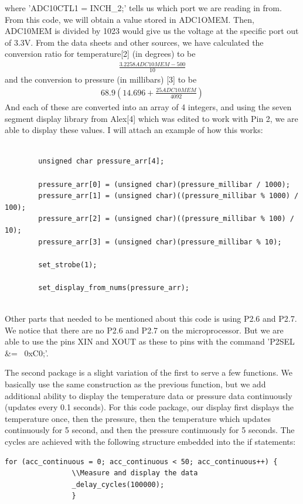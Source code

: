 \documentclass{article}
\begin{document}
where 'ADC10CTL1 = INCH\_2;' tells us which port we are reading in from. From this code, we will obtain a value stored in ADC1OMEM. Then, ADC10MEM is divided by 1023 would give us the voltage at the specific port out of 3.3V. From the data sheets and other sources, we have calculated the conversion ratio for temperature[2] (in degrees) to be
\begin{align}
    \frac{3.2258ADC10MEM - 500}{10} 
\end{align}
and the conversion to pressure (in millibars) [3] to be 
\begin{align}
    68.9(14.696 + \frac{25ADC10MEM}{4092})
\end{align}
And each of these are converted into an array of 4 integers, and using the seven segment display library from Alex[4] which was edited to work with Pin 2, we are able to display these values. I will attach an example of how this works:
\begin{lstlisting}[style=CStyle]

        unsigned char pressure_arr[4];
        
        pressure_arr[0] = (unsigned char)(pressure_millibar / 1000);
        pressure_arr[1] = (unsigned char)((pressure_millibar % 1000) / 100);
        pressure_arr[2] = (unsigned char)((pressure_millibar % 100) / 10);
        pressure_arr[3] = (unsigned char)(pressure_millibar % 10);

        set_strobe(1);

        set_display_from_nums(pressure_arr);
        
\end{lstlisting}
Other parts that needed to be mentioned about this code is using P2.6 and P2.7. We notice that there are no P2.6 and P2.7 on the microprocessor. But we are able to use the pins XIN and XOUT as these to pins with the command 'P2SEL \&= ~0xC0;'. 

The second package is a slight variation of the first to serve a few functions. We basically use the same construction as the previous function, but we add additional ability to display the temperature data or pressure data continuously (updates every 0.1 seconds). For this code package, our display first displays the temperature once, then the pressure, then the temperature which updates continuously for 5 second, and then the pressure continuously for 5 seconds. The cycles are achieved with the following structure embedded into the if statements: 
\begin{lstlisting}[style=CStyle]
for (acc_continuous = 0; acc_continuous < 50; acc_continuous++) {
                \\Measure and display the data
                _delay_cycles(100000);
                }
\end{lstlisting}
\end{document}
